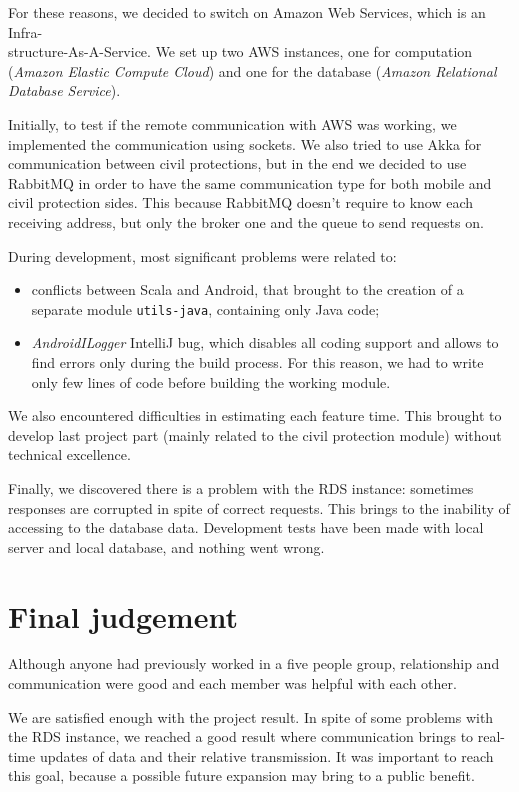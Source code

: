 \documentclass[a4paper,12pt]{report}
\begin{document}
For these reasons, we decided to switch on Amazon Web Services, which is an Infra-\\structure-As-A-Service. We set up two AWS instances, one for computation (\textit{Amazon Elastic Compute Cloud}) and one for the database (\textit{Amazon Relational Database Service}).

Initially, to test if the remote communication with AWS was working, we implemented the communication using sockets. We also tried to use Akka for communication between civil protections, but in the end we decided to use RabbitMQ in order to have the same communication type for both mobile and civil protection sides. This because RabbitMQ doesn't require to know each receiving address, but only the broker one and the queue to send requests on.

During development, most significant problems were related to:

\begin{itemize}
\item conflicts between Scala and Android, that brought to the creation of a separate module \texttt{utils-java}, containing only Java code;
\item \textit{AndroidILogger} IntelliJ bug, which disables all coding support and allows to find errors only during the build process. For this reason, we had to write only few lines of code before building the working module.
\end{itemize}

We also encountered difficulties in estimating each feature time. This brought to develop last project part (mainly related to the civil protection module) without technical excellence.

Finally, we discovered there is a problem with the RDS instance: sometimes responses are corrupted in spite of correct requests. This brings to the inability of accessing to the database data.
Development tests have been made with local server and local database, and nothing went wrong.

\section{Final judgement}

Although anyone had previously worked in a five people group, relationship and communication were good and each member was helpful with each other.

We are satisfied enough with the project result. In spite of some problems with the RDS instance, we reached a good result where communication brings to real-time updates of data and their relative transmission. It was important to reach this goal, because a possible future expansion may bring to a public benefit.
\end{document}
